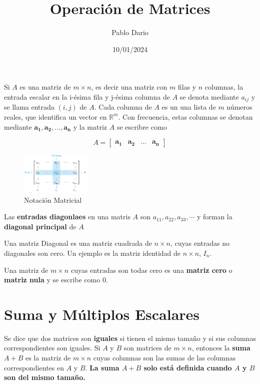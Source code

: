 \documentclass{article}
\title{Operación de Matrices}
\author{Pablo Dario}
\date{10/01/2024}
\begin{document}
\maketitle

Si $A$ es una matriz de $m \times n$, es decir una matriz con $m$ filas y $n$ columnas, la entrada escalar en la i-ésima fila y j-ésima columna de $A$ se denota mediante $a_{ij}$ y se llama entrada $(i,j)$ de $A$. Cada columna de $A$ es un una lista de $m$ números reales, que identifica un vector en $\mathbb{R}^m$. Con frecuencia, estas columnas se denotan mediante $\mathbf{a_1},\mathbf{a_2},\dots, \mathbf{a_n}$ y la matriz $A$ se escribre como

\begin{equation*}
    A = \begin{bmatrix}
        \mathbf{a_1} & \mathbf{a_2} & \dots & \mathbf{a_n}
    \end{bmatrix}
\end{equation*}

\begin{figure}[ht]
  \centerline{\includegraphics[width=0.3\textwidth]{image.png}}
  \caption{Notación Matricial}
\end{figure}

Las \textbf{entradas diagonlaes} en una matris $A$ son $a_11, a_22, a_33, \dotsb$ y forman la \textbf{diagonal principal} de $A$

\begin{tcolorbox}[colback=blue!10!white,colframe=blue!60!black,title=Matrices Especiales]
    Una matriz Diagonal es una matriz cuadrada de $n \times n$, cuyas entradas no diagonales son cero. Un ejemplo es la matriz identidad de $n \times n$, $I_n$. 

    Una matriz de $m \times n$ cuyas entradas son todas cero es una \textbf{matriz cero} o \textbf{matriz nula} y se escribe como 0.
\end{tcolorbox}
 
\section*{Suma y Múltiplos Escalares}

Se dice que dos matrices son \textbf{iguales} si tienen el mismo tamaño y si sus columnas correspondientes son iguales. Si $A$ y $B$ son matrices de $m \times n$, entonces la \textbf{suma} $A + B$ es la matriz de $m \times n$ cuyas columnas son las sumas de las columnas correspondientes en $A$ y $B$. \textbf{La suma $A + B$ solo está definida cuando $A$ y $B$ son del mismo tamaño.}
\end{document}
